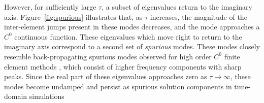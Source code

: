 \documentclass[preprint,10pt]{elsarticle}
\begin{document}
However, for sufficiently large $\tau$, a subset of eigenvalues return to the imaginary axis.  Figure~\ref{fig:spurious} illustrates that, as $\tau$ increases, the magnitude of the inter-element jumps present in these modes decreases, and the mode approaches a $C^0$ continuous function.  These eigenvalues which move right to return to the imaginary axis correspond to a second set of \emph{spurious} modes.  These modes closely resemble back-propagating spurious modes observed for high order $C^0$ finite element methods \cite{ainsworth2014dispersive}, which consist of higher frequency components with sharp peaks.  Since the real part of these eigenvalues approaches zero as $\tau\rightarrow \infty$, these modes become undamped and persist as spurious solution components in time-domain simulations \cite{hughes2014finite}
\end{document}
